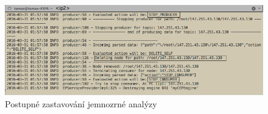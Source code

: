 \documentclass[
  digital, %
  table,   %
  nolof,     %
  nolot,     %
  oneside, %
  nocover,
  monochrome,
  12pt
]{fithesis3}
\begin{document}
\begin{figure}[H]
	\centering
    \includegraphics[width=.8\linewidth, height=.14\textheight]{images/clean-up-screen.png}
    \caption{Postupné zastavování jemnozrné analýzy}
    \label{fig:clean-up-screen}
\end{figure}
\end{document}
